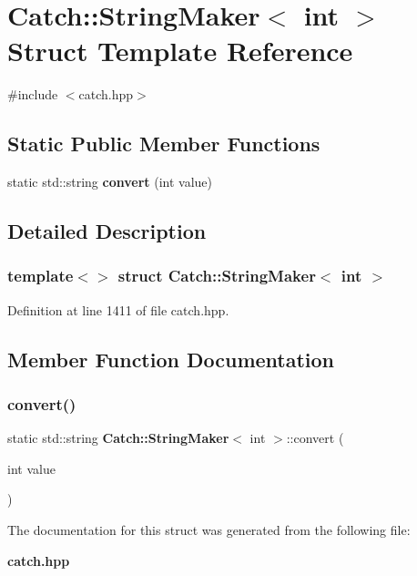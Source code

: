 \section{Catch\+::String\+Maker$<$ int $>$ Struct Template Reference}
\label{struct_catch_1_1_string_maker_3_01int_01_4}


{\ttfamily \#include $<$catch.\+hpp$>$}

\subsection*{Static Public Member Functions}
\begin{DoxyCompactItemize}
\item 
static std\+::string \textbf{ convert} (int value)
\end{DoxyCompactItemize}


\subsection{Detailed Description}
\subsubsection*{template$<$$>$\newline
struct Catch\+::\+String\+Maker$<$ int $>$}



Definition at line 1411 of file catch.\+hpp.



\subsection{Member Function Documentation}
\mbox{\label{struct_catch_1_1_string_maker_3_01int_01_4_aab096e55fb7283f6ad47b5ca277e22e8}} 
\subsubsection{convert()}
{\footnotesize\ttfamily static std\+::string \textbf{ Catch\+::\+String\+Maker}$<$ int $>$\+::convert (\begin{DoxyParamCaption}\item[{int}]{value }\end{DoxyParamCaption})\hspace{0.3cm}{\ttfamily [static]}}



The documentation for this struct was generated from the following file\+:\begin{DoxyCompactItemize}
\item 
\textbf{ catch.\+hpp}\end{DoxyCompactItemize}
